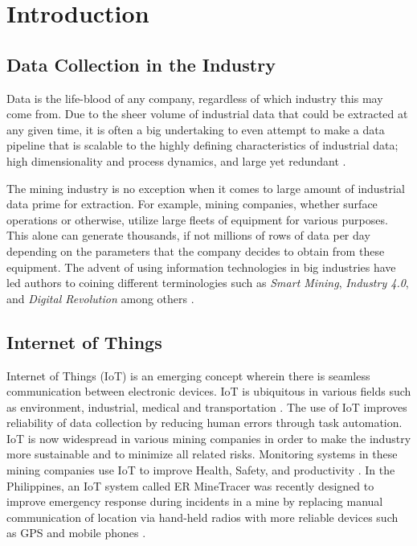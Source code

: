 \documentclass[12pt]{report}
\begin{document}
\section{Introduction}

\subsection{Data Collection in the Industry}

Data is the life-blood of any company, regardless of which industry this may come from.
Due to the sheer volume of industrial data that could be extracted at any given time, it is often a big undertaking to even attempt to make a data pipeline that is scalable to the highly defining characteristics of industrial data; high dimensionality and process dynamics, and large yet redundant \cite{Urhan}.

The mining industry is no exception when it comes to large amount of industrial data prime for extraction.
For example, mining companies, whether surface operations or otherwise, utilize large fleets of equipment for various purposes.
This alone can generate thousands, if not millions of rows of data per day depending on the parameters that the company decides to obtain from these equipment.
The advent of using information technologies in big industries have led authors to coining different terminologies such as \textit{Smart Mining}, \textit{Industry 4.0}, and \textit{Digital Revolution} among others \cite{SmartMining}.

\subsection{Internet of Things}

Internet of Things (IoT) is an emerging concept wherein there is seamless communication between electronic devices.
IoT is ubiquitous in various fields such as environment, industrial, medical and transportation \cite{IoT}.
The use of IoT improves reliability of data collection by reducing human errors through task automation.
IoT is now widespread in various mining companies in order to make the industry more sustainable and to minimize all related risks.
Monitoring systems in these mining companies use IoT to improve Health, Safety, and productivity \cite{IoTinMining}.
In the Philippines, an IoT system called ER MineTracer was recently designed to improve emergency response during incidents in a mine by replacing manual communication of location via hand-held radios with more reliable devices such as GPS and mobile phones \cite{ERMineTracer}.
\end{document}
